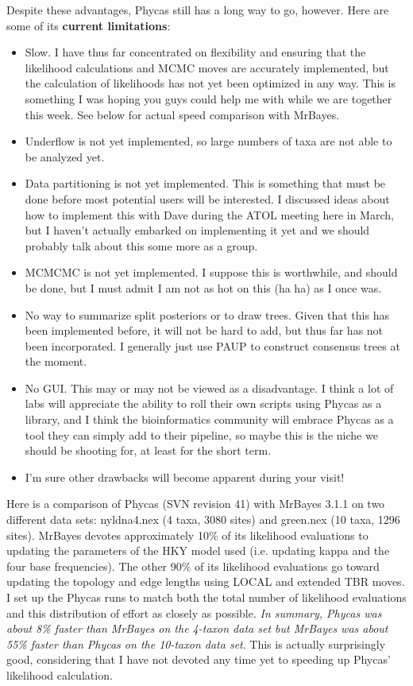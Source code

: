 \documentclass[10pt]{article}
\begin{document}
Despite these advantages, Phycas still has a long way to go, however. Here are some of its {\bfseries current limitations}:
\begin{itemize}
\item Slow. I have thus far concentrated on flexibility and ensuring that the likelihood calculations and MCMC moves are accurately implemented, but the calculation of likelihoods has not yet been optimized in any way. This is something I was hoping you guys could help me with while we are together this week. See below for actual speed comparison with MrBayes.
\item Underflow is not yet implemented, so large numbers of taxa are not able to be analyzed yet.
\item Data partitioning is not yet implemented. This is something that must be done before most potential users will be interested. I discussed ideas about how to implement this with Dave during the ATOL meeting here in March, but I haven't actually embarked on implementing it yet and we should probably talk about this some more as a group.
\item MCMCMC is not yet implemented. I suppose this is worthwhile, and should be done, but I must admit I am not as hot on this (ha ha) as I once was.
\item No way to summarize split posteriors or to draw trees. Given that this has been implemented before, it will not be hard to add, but thus far has not been incorporated. I generally just use PAUP to construct consensus trees at the moment.
\item No GUI. This may or may not be viewed as a disadvantage. I think a lot of labs will appreciate the ability to roll their own scripts using Phycas as a library, and I think the bioinformatics community will embrace Phycas as a tool they can simply add to their pipeline, so maybe this is the niche we should be shooting for, at least for the short term.
\item I'm sure other drawbacks will become apparent during your visit!
\end{itemize}

Here is a comparison of Phycas (SVN revision 41) with MrBayes 3.1.1 on two different data sets: nyldna4.nex (4 taxa, 3080 sites) and green.nex (10 taxa, 1296 sites). MrBayes devotes approximately 10\% of its likelihood evaluations to updating the parameters of the HKY model used (i.e. updating kappa and the four base frequencies). The other 90\% of its likelihood evaluations go toward updating the topology and edge lengths using LOCAL and extended TBR moves. I set up the Phycas runs to match both the total number of likelihood evaluations and this distribution of effort as closely as possible. {\em In summary, Phycas was about 8\% faster than MrBayes on the 4-taxon data set but MrBayes was about 55\% faster than Phycas on the 10-taxon data set}. This is actually surprisingly good, considering that I have not devoted any time yet to speeding up Phycas' likelihood calculation.
\end{document}
